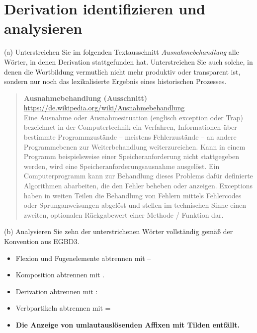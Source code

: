\section{Derivation identifizieren und analysieren}

(a) Unterstreichen Sie im folgenden Textausschnitt \textit{Ausnahmebehandlung} alle Wörter, in denen Derivation stattgefunden hat.
Unterstreichen Sie auch solche, in denen die Wortbildung vermutlich nicht mehr produktiv oder transparent ist, sondern nur noch das lexikalisierte Ergebnis eines historischen Prozesses.

 \begin{quote}\onehalfspacing
   \textbf{Ausnahmebehandlung (Ausschnitt)}\\
   {\footnotesize\url{https://de.wikipedia.org/wiki/Ausnahmebehandlung}}\\

   Eine Ausnahme oder Ausnahmesituation (englisch exception oder Trap) bezeichnet in der Computertechnik ein Verfahren, Informationen über bestimmte Programmzustände – meistens Fehlerzustände – an andere Programmebenen zur Weiterbehandlung weiterzureichen.
Kann in einem Programm beispielsweise einer Speicheranforderung nicht stattgegeben werden, wird eine Speicheranforderungsausnahme ausgelöst. Ein Computerprogramm kann zur Behandlung dieses Problems dafür definierte Algorithmen abarbeiten, die den Fehler beheben oder anzeigen.
Exceptions haben in weiten Teilen die Behandlung von Fehlern mittels Fehlercodes oder Sprunganweisungen abgelöst und stellen im technischen Sinne einen zweiten, optionalen Rückgabewert einer Methode / Funktion dar.
 \end{quote}

\Zeile

(b) Analysieren Sie zehn der unterstrichenen Wörter vollständig gemäß der Konvention aus EGBD3.

\begin{itemize}\Lf
  \item Flexion und Fugenelemente abtrennen mit --
  \item Komposition abtrennen mit .
  \item Derivation abtrennen mit :
  \item Verbpartikeln abtrennen mit =
  \item \textbf{Die Anzeige von umlautauslösenden Affixen mit Tilden entfällt.}
\end{itemize}

\newpage

